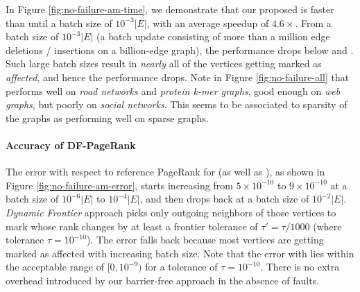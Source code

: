 In Figure \ref{fig:no-failure-am-time}, we demonstrate that our proposed \FroBarf{}  is faster than \NaiBarf{} until a batch size of $10^{-3} |E|$, with an average speedup of $4.6\times$. From a batch size of $10^{-3} |E|$ (a batch update consisting of more than a million edge deletions / insertions on a billion-edge graph), the performance drops below \NaiBarf{} and \StaBarf{}. Such large batch sizes result in {\em nearly} all of the vertices getting marked as {\em affected}, and hence the performance drops. Note in Figure \ref{fig:no-failure-all} that \FroBarf{} performs well on \textit{road networks} and \textit{protein k-mer graphs}, good enough on \textit{web graphs}, but poorly on \textit{social networks}. This seems to be associated to sparsity of the graphs as \FroBarf{} performing well on sparse graphs.














\paragraph{Accuracy of DF-PageRank}

The error with respect to reference PageRank for \FroBarf{} (as well as \FroWbar{}), as shown in Figure \ref{fig:no-failure-am-error}, starts increasing from $5\times10^{-10}$ to $9\times10^{-10}$ at a batch size of $10^{-6} |E|$ to $10^{-4} |E|$, and then drops back at a batch size of $10^{-2} |E|$. \textit{Dynamic Frontier} approach picks only outgoing neighbors of those vertices to mark whose rank changes by at least a frontier tolerance of $\tau' = \tau/1000$ (where tolerance $\tau = 10^{-10}$). The error falls back because most vertices are getting marked as affected with increasing batch size.  Note that the error with \FroBarf{} lies within the acceptable range of $[0, 10^{-9})$ for a tolerance of $\tau = 10^{-10}$. There is no extra overhead introduced by our barrier-free approach in the absence of faults.

% 



